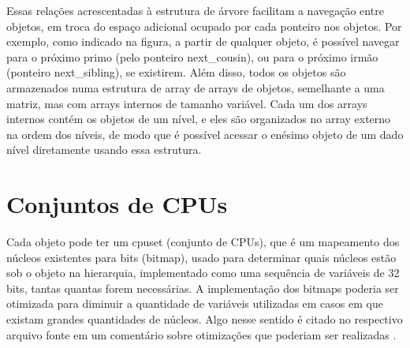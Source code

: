 Essas relações acrescentadas à estrutura de árvore facilitam a navegação entre objetos, em troca do espaço adicional ocupado por cada ponteiro nos objetos.
Por exemplo, como indicado na figura, a partir de qualquer objeto, é possível navegar para o próximo primo (pelo ponteiro next\_cousin), ou para o próximo irmão (ponteiro next\_sibling), se existirem.
Além disso, todos os objetos são armazenados numa estrutura de array de arrays de objetos, semelhante a uma matriz, mas com arrays internos de tamanho variável.
Cada um dos arrays internos contém os objetos de um nível, e eles são organizados no array externo na ordem dos níveis, de modo que é possível acessar o enésimo objeto de um dado nível diretamente usando essa estrutura.


\section{Conjuntos de CPUs}
\label{sec:conjuntos_de_cpus}

Cada objeto pode ter um cpuset (conjunto de CPUs), que é um mapeamento dos núcleos existentes para bits (bitmap), usado para determinar quais núcleos estão sob o objeto na hierarquia, implementado como uma sequência de variáveis de 32 bits, tantas quantas forem necessárias.
A implementação dos bitmaps poderia ser otimizada para diminuir a quantidade de variáveis utilizadas em casos em que existam grandes quantidades de núcleos.
Algo nesse sentido é citado no respectivo arquivo fonte em um comentário sobre otimizações que poderiam ser realizadas \cite{hwlocCod}.